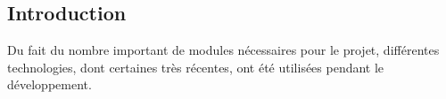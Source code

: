 \subsection{Introduction}
Du fait du nombre important de modules nécessaires pour le projet, différentes technologies, dont certaines très récentes, ont été utilisées pendant le développement.